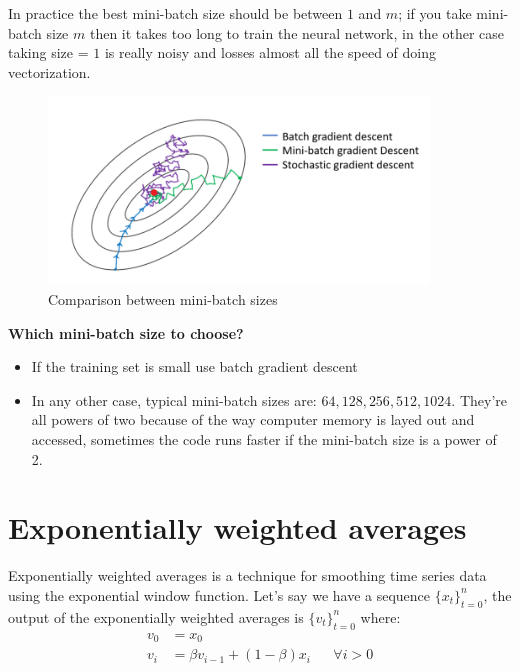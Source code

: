 In practice the best mini-batch size should be between $1$ and $m$; if you take mini-batch
size $m$ then it takes too long to train the neural network, in the other case taking
size = $1$ is really noisy and losses almost all the speed of doing vectorization.

\begin{figure}[H]
    \begin{center}
            \includegraphics[width=0.9\textwidth]{img/descent.png}
            \caption{Comparison between mini-batch sizes}
        \end{center}
\end{figure}

\textbf{Which mini-batch size to choose?}
\begin{itemize}
    \item If the training set is small use batch gradient descent
    \item In any other case, typical mini-batch sizes are: $64,128,256,512,1024$. They're 
    all powers of two because of the way computer memory is layed out and accessed, 
    sometimes the code runs faster if the mini-batch size is a power of 2.
\end{itemize}

\section*{Exponentially weighted averages}

Exponentially weighted averages is a technique for smoothing time series data using the
exponential window function. Let's say we have a sequence $\{x_t\}_{t=0}^n$, the output
of the exponentially weighted averages is $\{v_t\}_{t=0}^n$ where:
\begin{align*}
    v_0 &= x_0 \\
    v_i &= \beta v_{i-1} + (1-\beta) x_i  && \forall i>0
\end{align*}

